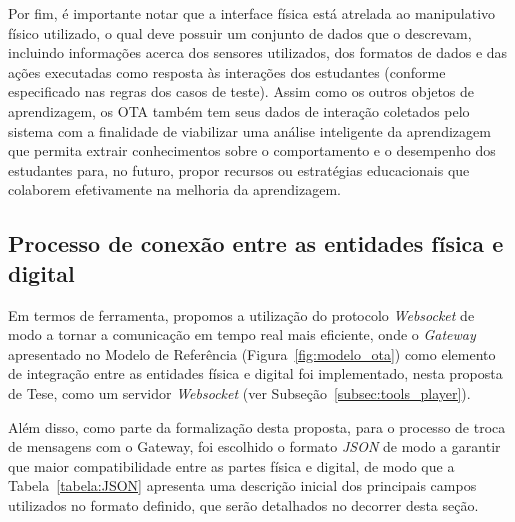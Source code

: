 Por fim, é importante notar que a interface física está atrelada ao manipulativo físico utilizado, o qual deve possuir um conjunto de dados que o descrevam, incluindo informações acerca dos sensores utilizados, dos formatos de dados e das ações executadas como resposta às interações dos estudantes (conforme especificado nas regras dos casos de teste). Assim como os outros objetos de aprendizagem, os OTA também tem seus dados de interação coletados pelo sistema com a finalidade de viabilizar uma análise inteligente da aprendizagem que permita extrair conhecimentos sobre o comportamento e o desempenho dos estudantes para, no futuro, propor recursos ou estratégias educacionais que colaborem efetivamente na melhoria da aprendizagem.


\subsection{Processo de conexão entre as entidades física e digital}\label{sub:JSON}

Em termos de ferramenta, propomos a utilização do protocolo \textit{Websocket} de modo a tornar a comunicação em tempo real mais eficiente, onde o \textit{Gateway} apresentado no Modelo de Referência (Figura~\ref{fig:modelo_ota}) como elemento de integração entre as entidades física e digital foi implementado, nesta proposta de Tese, como um servidor \textit{Websocket} (ver Subseção~\ref{subsec:tools_player}). 

Além disso, como parte da formalização desta proposta, para o processo de troca de mensagens com o Gateway, foi escolhido o formato \textit{JSON} de modo a garantir que maior compatibilidade entre as partes física e digital, de modo que a Tabela~\ref{tabela:JSON} apresenta uma descrição inicial dos principais campos utilizados no formato definido, que serão detalhados no decorrer desta seção.

